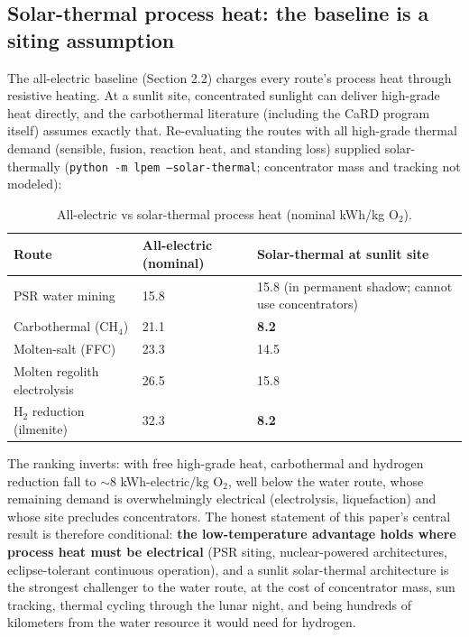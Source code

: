 \documentclass[11pt,a4paper]{article}
\begin{document}
\subsection{Solar-thermal process heat: the baseline is a siting assumption}

The all-electric baseline (Section 2.2) charges every route's process heat through
resistive heating. At a sunlit site, concentrated sunlight can deliver high-grade heat
directly, and the carbothermal literature (including the CaRD program itself) assumes
exactly that. Re-evaluating the routes with all high-grade thermal demand (sensible,
fusion, reaction heat, and standing loss) supplied solar-thermally
(\texttt{python -m lpem --solar-thermal}; concentrator mass and tracking not modeled):

\begin{table}[ht]
  \centering
  \caption{All-electric vs solar-thermal process heat (nominal kWh/kg O$_2$).}
  \begin{tabular}{lll}
    \toprule
    Route & All-electric (nominal) & Solar-thermal at sunlit site \\
    \midrule
    PSR water mining              & 15.8 & 15.8 (in permanent shadow; cannot use concentrators) \\
    Carbothermal (CH$_4$)         & 21.1 & \textbf{8.2} \\
    Molten-salt (FFC)             & 23.3 & 14.5 \\
    Molten regolith electrolysis  & 26.5 & 15.8 \\
    H$_2$ reduction (ilmenite)    & 32.3 & \textbf{8.2} \\
    \bottomrule
  \end{tabular}
  \label{tab:solarthermal}
\end{table}

The ranking inverts: with free high-grade heat, carbothermal and hydrogen reduction fall
to $\sim$8 kWh-electric/kg O$_2$, well below the water route, whose remaining demand is
overwhelmingly electrical (electrolysis, liquefaction) and whose site precludes
concentrators. The honest statement of this paper's central result is therefore
conditional: \textbf{the low-temperature advantage holds where process heat must be
electrical} (PSR siting, nuclear-powered architectures, eclipse-tolerant continuous
operation), and a sunlit solar-thermal architecture is the strongest challenger to the
water route, at the cost of concentrator mass, sun tracking, thermal cycling through the
lunar night, and being hundreds of kilometers from the water resource it would need for
hydrogen.
\end{document}
